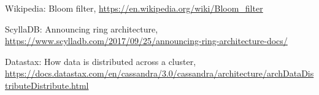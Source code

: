 \documentclass[10pt, a4paper, twocolumn]{article} %
\begin{document}

\begin{thebibliography}{9}
	Wikipedia: Bloom filter,
	\url{https://en.wikipedia.org/wiki/Bloom\_filter}

	ScyllaDB: Announcing ring architecture,
	\url{https://www.scylladb.com/2017/09/25/announcing-ring-architecture-docs/}

	Datastax: How data is distributed across a cluster,
	\url{https://docs.datastax.com/en/cassandra/3.0/cassandra/architecture/archDataDistributeDistribute.html}
\end{thebibliography}
\end{document}
